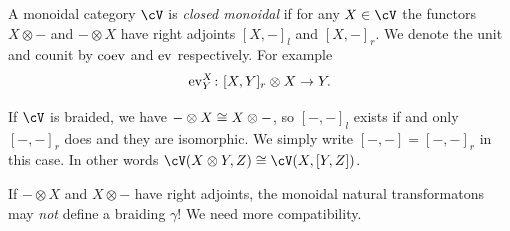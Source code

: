 \documentclass[a4paper,11pt,oneside,openany]{scrbook}
\begin{document}
\begin{defn}
	A monoidal category $ \cV $ is \emph{closed monoidal} if for any $ X \in \cV $ the functors $ X\otimes - $ and $ -\otimes X $ have right adjoints $ [X,-]_l $ and $ [X,-]_r $.
	We denote the unit and counit by $ \operatorname{coev} $ and $ \operatorname{ev} $ respectively.
	For example
	\begin{displaymath}
		\operatorname{ev}^X_Y \colon [X,Y]_r \otimes X \rightarrow Y.
	\end{displaymath}
\end{defn}
\begin{rmk}
	If $ \cV $ is braided, we have $ -\otimes X \cong X\otimes - $, so $ [-,-]_l $ exists if and only $ [-,-]_r $ does and they are isomorphic.
	We simply write $ [-,-] = [-,-]_r $ in this case.
	In other words $ \cV(X\otimes Y,Z)\iso \cV(X,[Y,Z]) $.
\end{rmk}

\begin{rmk}
	If $ -\otimes X $ and $ X\otimes - $ have right adjoints, the monoidal natural transformatons may \emph{not} define a braiding $ \gamma $!
	We need more compatibility.
\end{rmk}
\end{document}
